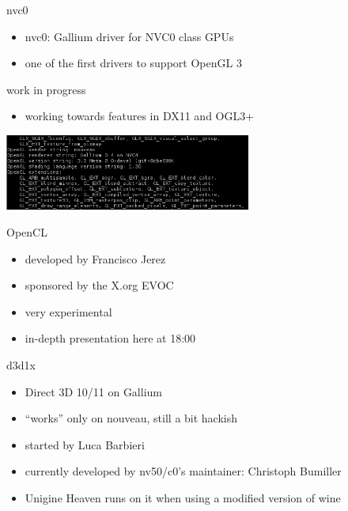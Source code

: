 \documentclass[11pt,english,compress]{beamer}
\begin{document}
		\begin{frame}
			\begin{block}{nvc0}
				\begin{itemize}
					\item nvc0: Gallium driver for NVC0 class GPUs
					\item one of the first drivers to support OpenGL 3
				\end{itemize}
			\end{block}
			\begin{block}{work in progress}
				\begin{itemize}
					\item working towards features in DX11 and OGL3+
				\end{itemize}
			\end{block}

			\begin{center}
				\includegraphics[height=2.5cm]{imgs/opengl3.png}
			\end{center}
		\end{frame}
		\begin{frame}
			\begin{block}{OpenCL}
				\begin{itemize}
					\item developed by Francisco Jerez
					\item sponsored by the X.org EVOC
					\item very experimental
					\item in-depth presentation here at 18:00
				\end{itemize}
			\end{block}

			\begin{block}{d3d1x}
				\begin{itemize}
					\item Direct 3D 10/11 on Gallium
					\item ``works'' only on nouveau, still a bit hackish
					\item started by Luca Barbieri
					\item currently developed by nv50/c0's maintainer: Christoph Bumiller
					\item Unigine Heaven runs on it when using a modified version of wine
				\end{itemize}
			\end{block}
		\end{frame}
\end{document}
